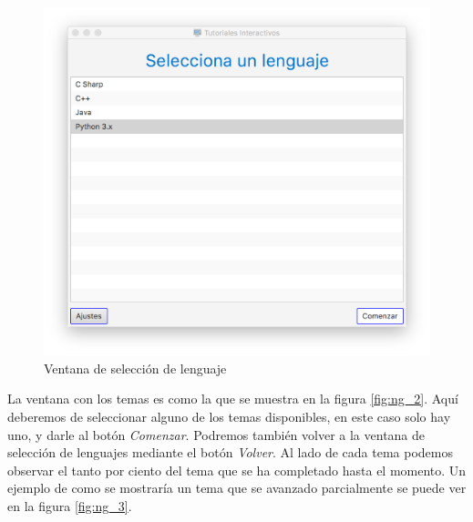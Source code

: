 \documentclass[]{article}
\begin{document}
%
\begin{figure}[tbp]
\begin{center}
\includegraphics[scale=0.35]{ng_1.png}
\end{center}
\caption{Ventana de selección de lenguaje\label{fig:ng_1}}
\end{figure}
%

La ventana con los temas es como la que se muestra en la figura \ref{fig:ng_2}. Aquí deberemos de seleccionar alguno de los temas disponibles, en este caso solo hay uno, y darle al botón \emph{Comenzar}. Podremos también volver a la ventana de selección de lenguajes mediante el botón \emph{Volver}. Al lado de cada tema podemos observar el tanto por ciento del tema que se ha completado hasta el momento. Un ejemplo de como se mostraría un tema que se avanzado parcialmente se puede ver en la figura \ref{fig:ng_3}.
\end{document}
